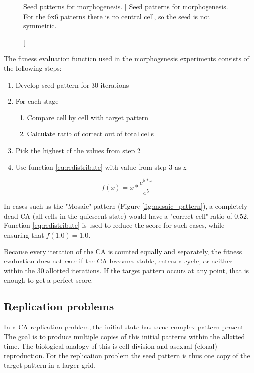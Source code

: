 \begin{figure}
\caption
[
    Seed patterns for morphogenesis.
]
{
    Seed patterns for morphogenesis.
    For the 6x6 patterns there is no central cell, so the seed is not symmetric.}
\label{fig:seed}
\end{figure}

The fitness evaluation function used in the morphogenesis experiments consists of the following steps:

\begin{enumerate}
    \item Develop seed pattern for 30 iterations
    \item For each stage
        \begin{enumerate}
            \item Compare cell by cell with  target pattern
            \item Calculate ratio of correct out of total cells
        \end{enumerate}
    \item Pick the highest of the values from step 2
    \item Use function \eqref{eq:redistribute} with value from step 3 as x
\end{enumerate}

\begin{equation}
    \label{eq:redistribute}
    f(x) = x * \frac{e^{5*x}}{e^{5}}
\end{equation}

In cases such as the "Mosaic" pattern (Figure \ref{fig:mosaic_pattern}), a completely dead CA (all cells in the quiescent state) would have a "correct cell" ratio of $0.52$.
Function \eqref{eq:redistribute} is used to reduce the score for such cases, while ensuring that $f(1.0) = 1.0$.

Because every iteration of the CA is counted equally and separately,
the fitness evaluation does not care if the CA becomes stable, enters a cycle, or neither within the 30 allotted iterations.
If the target pattern occurs at any point, that is enough to get a perfect score.

\subsection{Replication problems}
In a CA replication problem, the initial state has some complex pattern present.
The goal is to produce multiple copies of this initial patterns within the allotted time.
The biological analogy of this is cell division and asexual (clonal) reproduction.
For the replication problem the seed pattern is thus one copy of the target pattern in a larger grid.

